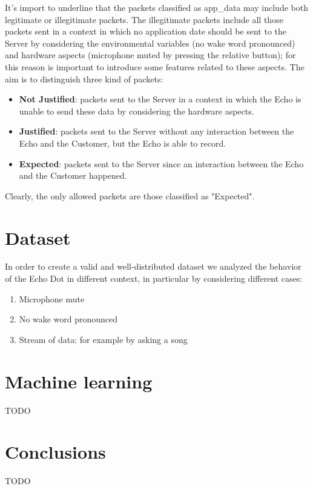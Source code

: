 \documentclass[sigconf]{acmart}
\begin{document}
It's import to underline that the packets classified as app\_data may include both legitimate or illegitimate packets.
The illegitimate packets include all those packets sent in a context in which no application date should be sent to the Server by considering the environmental variables (no wake word pronounced) and hardware aspects (microphone muted by pressing the relative button); for this reason is important to introduce some features related to these aspects.
The aim is to distinguish three kind of packets:
\begin{itemize}
  \item \textbf{Not Justified}: packets sent to the Server in a context in which the Echo is unable to send these data by considering the hardware aspects.
  \item \textbf{Justified}: packets sent to the Server without any interaction between the Echo and the Customer, but the Echo is able to record.
  \item \textbf{Expected}: packets sent to the Server since an interaction between the Echo and the Customer happened.
\end{itemize}
Clearly, the only allowed packets are those classified as "Expected".

\section{Dataset}
In order to create a valid and well-distributed dataset we analyzed the behavior of the Echo Dot in different context, in particular by considering different cases:
\begin{enumerate}
  \item Microphone mute
  \item No wake word pronounced
  \item Stream of data: for example by asking a song
\end{enumerate}

\section{Machine learning}
TODO

\section{Conclusions}
TODO



\end{document}
